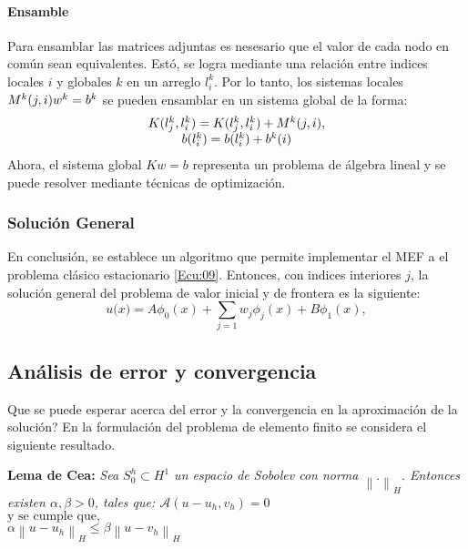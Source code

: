 \documentclass[12pt]{article}
\begin{document}
\paragraph{Ensamble}
Para ensamblar las matrices adjuntas es nesesario que el valor de cada nodo en común sean equivalentes. Estó, se logra mediante una relación entre indices locales $i$ y globales $k$ en un arreglo $l^k_i$. Por lo tanto, los sistemas locales $\Large{M}^k(j,i)w^k=b^k$ se pueden ensamblar en un sistema global de la forma:
\begin{equation*}
\begin{array}{c}
\Large{K}(l^k_j,l^k_i) =\Large{K}(l^k_j,l^k_i) + \Large{M}^k(j,i),\\ \Large{b}(l^k_i) =\Large{b}(l^k_i) + \Large{b}^k(i)
\end{array}
\end{equation*}
Ahora, el sistema global $K\textit{w}=\textit{b}$ representa un problema de álgebra lineal y se puede resolver mediante técnicas de optimización.
\subsubsection{Solución General}
En conclusión, se establece un algoritmo que permite implementar el MEF a el problema clásico estacionario \eqref{Ecu:09}. Entonces, con indices interiores $\textit{j}$, la solución  general del problema de valor inicial y de frontera es la siguiente:
\[ 
\textit{u(x)} = A\phi_0(x) + \sum_{j=1} w_j\phi_j(x) + B\phi_1(x),
 \]
\subsection{Análisis de error y convergencia}
Que se puede esperar acerca del error y la convergencia en la aproximación de la solución? En la formulación del problema de elemento finito se considera el siguiente resultado.

{\bf Lema de Cea:}{\em \quad
	Sea $S_0^h \subset H^1$ un espacio de Sobolev con \textit{norma} $\left\|.\right \|_H$. Entonces existen $\alpha, \beta>0$, tales que:
	$\mathcal{A}(u-u_h,v_h)=0$\\
	$\text{y se cumple que, }$\\[0.3cm]
	$\alpha\left\| u- u_h\right \|_H \leq \beta\left\|u-v_h\right\|_H$}
\end{document}
